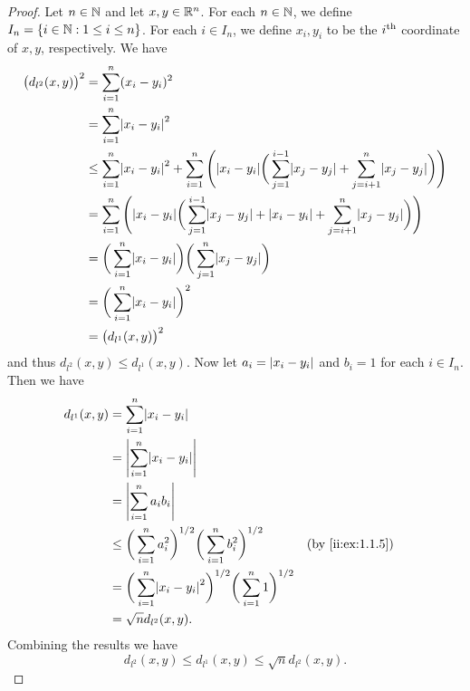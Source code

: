 \begin{proof}
  Let \(n \in \mathbb{N}\) and let \(x, y \in \mathbb{R}^n\).
  For each \(n \in \mathbb{N}\), we define \(I_n = \left\lbrace i \in \mathbb{N} : 1 \leq i \leq n\right\rbrace\).
  For each \(i \in I_n\), we define \(x_i, y_i\) to be the \(i^{\operatorname{th}}\) coordinate of \(x, y\), respectively.
  We have
  \begin{align*}
    \big(d_{l^2}(x, y)\big)^2 & = \sum_{i = 1}^n (x_i - y_i)^2                                                                                                                                           \\
                              & = \sum_{i = 1}^n \abs{x_i - y_i}^2                                                                                                                                       \\
                              & \leq \sum_{i = 1}^n \abs{x_i - y_i}^2 + \sum_{i = 1}^n \Bigg(\abs{x_i - y_i} \bigg(\sum_{j = 1}^{i - 1} \abs{x_j - y_j} + \sum_{j = i + 1}^n \abs{x_j - y_j}\bigg)\Bigg) \\
                              & = \sum_{i = 1}^n \Bigg(\abs{x_i - y_i} \bigg(\sum_{j = 1}^{i - 1} \abs{x_j - y_j} + \abs{x_i - y_i} + \sum_{j = i + 1}^n \abs{x_j - y_j}\bigg)\Bigg)                     \\
                              & = \bigg(\sum_{i = 1}^n \abs{x_i - y_i}\bigg) \bigg(\sum_{j = 1}^n \abs{x_j - y_j}\bigg)                                                                                  \\
                              & = \bigg(\sum_{i = 1}^n \abs{x_i - y_i}\bigg)^2                                                                                                                           \\
                              & = \big(d_{l^1}(x, y)\big)^2
  \end{align*}
  and thus \(d_{l^2}(x, y) \leq d_{l^1}(x, y)\).
  Now let \(a_i = \left\lvert x_i - y_i\right\rvert\) and \(b_i = 1\) for each \(i \in I_n\).
  Then we have
  \begin{align*}
    d_{l^1}(x, y) & = \sum_{i = 1}^n \abs{x_i - y_i}                                                                                  \\
                  & = \abs{\sum_{i = 1}^n \abs{x_i - y_i}}                                                                            \\
                  & = \abs{\sum_{i = 1}^n a_i b_i}                                                                                    \\
                  & \leq \bigg(\sum_{i = 1}^n a_i^2\bigg)^{1 / 2} \bigg(\sum_{i = 1}^n b_i^2\bigg)^{1 / 2}      &  & \by{ii:ex:1.1.5} \\
                  & = \bigg(\sum_{i = 1}^n \abs{x_i - y_i}^2\bigg)^{1 / 2} \bigg(\sum_{i = 1}^n 1\bigg)^{1 / 2}                       \\
                  & = \sqrt{n} d_{l^2}(x, y).
  \end{align*}
  Combining the results we have
  \[
    d_{l^2}(x, y) \leq d_{l^1}(x, y) \leq \sqrt{n} d_{l^2}(x, y).
  \]
\end{proof}

